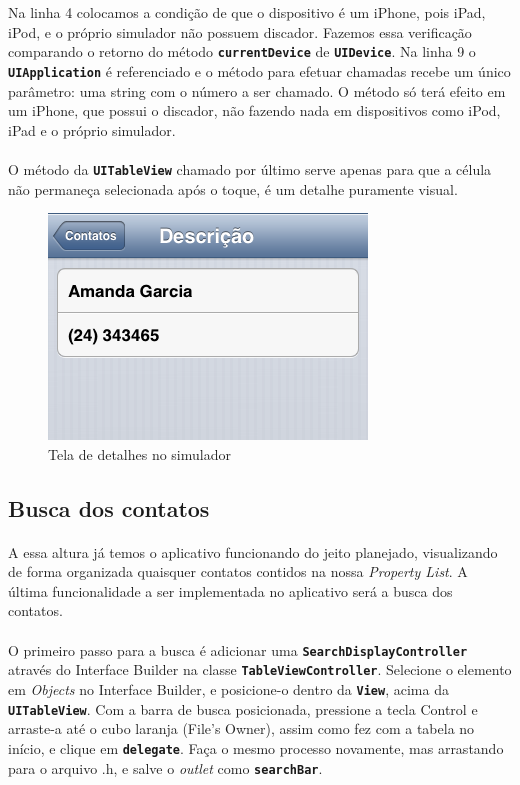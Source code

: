 \documentclass[a4paper,12pt,brazil,doubleside]{book}
\begin{document}
Na linha 4 colocamos a condição de que o dispositivo é um iPhone, pois iPad, iPod, e o próprio simulador não possuem discador. Fazemos essa verificação comparando o retorno do método \texttt{\textbf{currentDevice}} de \texttt{\textbf{UIDevice}}. Na linha 9 o \texttt{\textbf{UIApplication}} é referenciado e o método para efetuar chamadas recebe um único parâmetro: uma string com o número a ser chamado. O método só terá efeito em um iPhone, que possui o discador, não fazendo nada em dispositivos como iPod, iPad e o próprio simulador.
\paragraph{}O método da \texttt{\textbf{UITableView}} chamado por último serve apenas para que a célula não permaneça selecionada após o toque, é um detalhe puramente visual.

\begin{figure}[h]
  \centering
  \includegraphics[totalheight=0.2\textheight]{figuras/table/table5.png}
  \caption{Tela de detalhes no simulador}
  \label{fig:a}
\end{figure}

\pagebreak

\subsection{Busca dos contatos}

\paragraph{}A essa altura já temos o aplicativo funcionando do jeito planejado, visualizando de forma organizada quaisquer contatos contidos na nossa \emph{Property List}. A última funcionalidade a ser implementada no aplicativo será a busca dos contatos.
\paragraph{}O primeiro passo para a busca é adicionar uma \texttt{\textbf{SearchDisplayController}} através do Interface Builder na classe \texttt{\textbf{TableViewController}}. Selecione o elemento em \emph{Objects} no Interface Builder, e posicione-o dentro da \texttt{\textbf{View}}, acima da \texttt{\textbf{UITableView}}. Com a barra de busca posicionada, pressione a tecla Control e arraste-a até o cubo laranja (File's Owner), assim como fez com a tabela no início, e clique em \texttt{\textbf{delegate}}. Faça o mesmo processo novamente, mas arrastando para o arquivo .h, e salve o \emph{outlet} como \texttt{\textbf{searchBar}}.
\end{document}

